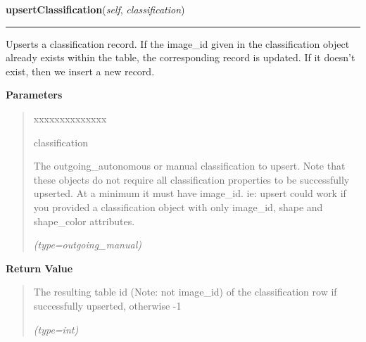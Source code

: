 \hspace{.8\funcindent}\begin{boxedminipage}{\funcwidth}

    \raggedright \textbf{upsertClassification}(\textit{self}, \textit{classification})

    \vspace{-1.5ex}

    \rule{\textwidth}{0.5\fboxrule}
\setlength{\parskip}{2ex}
    Upserts a classification record. If the image\_id given in the 
    classification object already exists within the table, the 
    corresponding record is updated. If it doesn't exist, then we insert a 
    new record.

\setlength{\parskip}{1ex}
      \textbf{Parameters}
      \vspace{-1ex}

      \begin{quote}
        \begin{Ventry}{xxxxxxxxxxxxxx}

          \item[classification]

          The outgoing\_autonomous or manual classification to upsert. Note
          that these objects do not require all classification properties 
          to be successfully upserted. At a minimum it must have image\_id.
          ie: upsert could work if you provided a classification object 
          with only image\_id, shape and shape\_color attributes.

            {\it (type=outgoing\_manual)}

        \end{Ventry}

      \end{quote}

      \textbf{Return Value}
    \vspace{-1ex}

      \begin{quote}
      The resulting table id (Note: not image\_id) of the classification 
      row if successfully upserted, otherwise -1

      {\it (type=int)}

      \end{quote}

    \end{boxedminipage}

    \label{src:dao:classification_dao:ClassificationDAO:addClassification}

